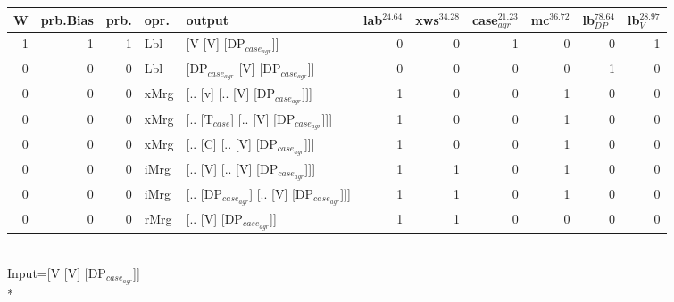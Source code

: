 \begin{tabularx}{\linewidth}{rrrlXrrrrrr}
\hline
   W &   prb.Bias &   prb. & opr.   & output                                    &   lab$^{24.64}$ &   xws$^{34.28}$ &   case$_{agr}^{21.23}$ &   mc$^{36.72}$ &   lb$_{DP}^{78.64}$ &   lb$_{V}^{28.97}$ \\
\hline
   1 &       1 &   1 & Lbl  & [V [V] [DP$_{case_{agr}}$]]                     &             0 &             0 &                  1 &            0 &               0 &              1 \\
   0 &       0 &   0 & Lbl  & [DP$_{case_{agr}}$ [V] [DP$_{case_{agr}}$]]           &             0 &             0 &                  0 &            0 &               1 &              0 \\
   0 &       0 &   0 & xMrg & [.. [v] [.. [V] [DP$_{case_{agr}}$]]]           &             1 &             0 &                  0 &            1 &               0 &              0 \\
   0 &       0 &   0 & xMrg & [.. [T$_{case}$] [.. [V] [DP$_{case_{agr}}$]]]      &             1 &             0 &                  0 &            1 &               0 &              0 \\
   0 &       0 &   0 & xMrg & [.. [C] [.. [V] [DP$_{case_{agr}}$]]]           &             1 &             0 &                  0 &            1 &               0 &              0 \\
   0 &       0 &   0 & iMrg & [.. [V] [.. [V] [DP$_{case_{agr}}$]]]           &             1 &             1 &                  0 &            1 &               0 &              0 \\
   0 &       0 &   0 & iMrg & [.. [DP$_{case_{agr}}$] [.. [V] [DP$_{case_{agr}}$]]] &             1 &             1 &                  0 &            1 &               0 &              0 \\
   0 &       0 &   0 & rMrg & [.. [V] [DP$_{case_{agr}}$]]                    &             1 &             1 &                  0 &            0 &               0 &              0 \\
\hline
\end{tabularx}\endgroup\\
\begingroup\scriptsize Input=[V [V] [DP$_{case_{agr}}$]]\\*
